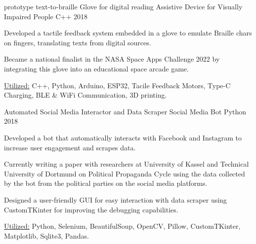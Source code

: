 \begin{cventries}
        
        \cventryprojects
        {prototype text-to-braille Glove for digital reading} %
        {Assistive Device for Visually Impaired People} %
        {C++} %
        {2018} %
        {
          \begin{cvitems} %
            \item { Developed a tactile feedback system embedded in a glove to emulate Braille chars on fingers, translating texts from digital sources.}
            \item { Became a national finalist in the NASA Space Apps Challenge 2022 by integrating this glove into an educational space arcade game.}
            \item {\underline{Utilized:} C++, Python, Arduino, ESP32, Tacile Feedback Motors, Type-C Charging, BLE \& WiFi Communication, 3D printing.}
          \end{cvitems}
          }
        \cventryprojects
        {Automated Social Media Interactor and Data Scraper} %
        {Social Media Bot} %
        {Python} %
        {2018} %
        {
          \begin{cvitems} %
            \item { Developed a bot that automatically interacts with Facebook and Instagram to increase user engagement and scrapes data.}
            \item { Currently writing a paper with researchers at University of Kassel and Technical University of Dortmund on Political Propaganda Cycle 
            using the data collected by the bot from the political parties on the social media platforms.}
            \item { Designed a user-friendly GUI for easy interaction with data scraper using CustomTKinter for improving the debugging capabilities.}
            \item {\underline{Utilized:} Python, Selenium, BeautifulSoup, OpenCV, Pillow, CustomTKinter, Matplotlib, Sqlite3, Pandas.}
          \end{cvitems}
          }
            

\end{cventries}
